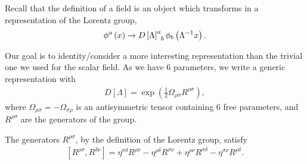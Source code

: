 
Recall that the definition of a field is an object which transforms in a representation of the Lorentz group,
\begin{align}
    \phi^{a}\left( x \right) \to \tensor{D\left[ \Lambda \right] }{^{a}_b} \phi_b \left( \Lambda^{-1} x \right) 
.\end{align}

Our goal is to identity/consider a more interesting representation than the trivial one we used for the scalar field. As we have 6 parameters, we write a generic representation with
\begin{align}
    D \left[ \Lambda \right] = \exp \left( \frac{1}{2}\Omega_{\rho \sigma} R^{\rho \sigma} \right) 
,\end{align}
where $\Omega_{\rho \sigma} = -\Omega_{\sigma \rho}$ is an antisymmetric tensor containing 6 free parameters, and $R^{\rho \sigma}$ are the generators of the group.

The generators $R^{\rho \sigma}$, by the definition of the Lorentz group, satisfy
\begin{align}
    \left[ R^{\rho \sigma}, R^{\delta \nu} \right] = \eta^{\sigma \delta} R^{\rho \nu} - \eta^{\rho \delta} R^{\sigma \nu} + \eta^{\rho \nu} R^{\sigma \delta} - \eta^{\sigma \nu} R^{\rho \delta}
.\end{align}

